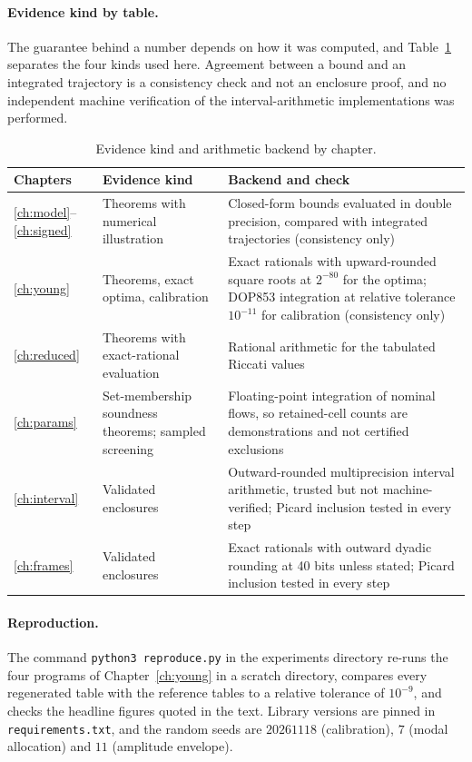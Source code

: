 \documentclass[11pt,notitlepage]{report}
\theoremstyle{definition}
\theoremstyle{remark}
\begin{document}
\paragraph{Evidence kind by table.} The guarantee behind a number depends on how it was computed, and Table~\ref{tab:evidence} separates the four kinds used here. Agreement between a bound and an integrated trajectory is a consistency check and not an enclosure proof, and no independent machine verification of the interval-arithmetic implementations was performed.
\begin{table}[ht]\centering\small
\caption{Evidence kind and arithmetic backend by chapter.}\label{tab:evidence}
\begin{tabular}{@{}p{1.6cm}p{4.0cm}p{6.4cm}@{}}\toprule
Chapters&Evidence kind&Backend and check\\\midrule
\ref{ch:model}--\ref{ch:signed}&Theorems with numerical illustration&Closed-form bounds evaluated in double precision, compared with integrated trajectories (consistency only)\\
\ref{ch:young}&Theorems, exact optima, calibration&Exact rationals with upward-rounded square roots at $2^{-80}$ for the optima; DOP853 integration at relative tolerance $10^{-11}$ for calibration (consistency only)\\
\ref{ch:reduced}&Theorems with exact-rational evaluation&Rational arithmetic for the tabulated Riccati values\\
\ref{ch:params}&Set-membership soundness theorems; sampled screening&Floating-point integration of nominal flows, so retained-cell counts are demonstrations and not certified exclusions\\
\ref{ch:interval}&Validated enclosures&Outward-rounded multiprecision interval arithmetic, trusted but not machine-verified; Picard inclusion tested in every step\\
\ref{ch:frames}&Validated enclosures&Exact rationals with outward dyadic rounding at 40 bits unless stated; Picard inclusion tested in every step\\\bottomrule
\end{tabular}
\end{table}

\paragraph{Reproduction.} The command \texttt{python3 reproduce.py} in the experiments directory re-runs the four programs of Chapter~\ref{ch:young} in a scratch directory, compares every regenerated table with the reference tables to a relative tolerance of $10^{-9}$, and checks the headline figures quoted in the text. Library versions are pinned in \texttt{requirements.txt}, and the random seeds are $20261118$ (calibration), $7$ (modal allocation) and $11$ (amplitude envelope).
\end{document}
